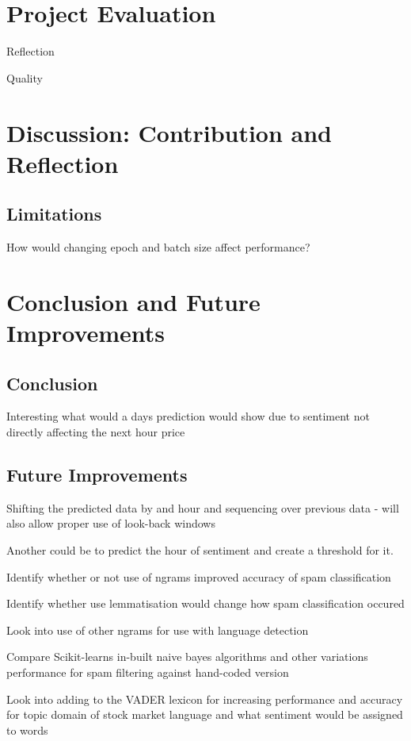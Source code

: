 \documentclass[oneside, 12pt]{article}
\begin{document}
	\newpage
	
	\section{Project Evaluation}
	Reflection
	
	Quality
	
	
	\section{Discussion: Contribution and Reflection}
	\subsection{Limitations}
	
	
	How would changing epoch and batch size affect performance?
	
	\newpage
	
	\section{Conclusion and Future Improvements}
		\subsection{Conclusion}
		Interesting what would a days prediction would show due to sentiment not directly affecting the next hour price
		
		\subsection{Future Improvements}
		Shifting the predicted data by and hour and sequencing over previous data - will also allow proper use of look-back windows
		
		Another could be to predict the hour of sentiment and create a threshold for it.
		
		Identify whether or not use of ngrams improved accuracy of spam classification
		
		Identify whether use lemmatisation would change how spam classification occured
		
		Look into use of other ngrams for use with language detection
		
		Compare Scikit-learns in-built naive bayes algorithms and other variations performance for spam filtering against hand-coded version
		
		Look into adding to the VADER lexicon for increasing performance and accuracy for topic domain of stock market language and what sentiment would be assigned to words
		
\end{document}
